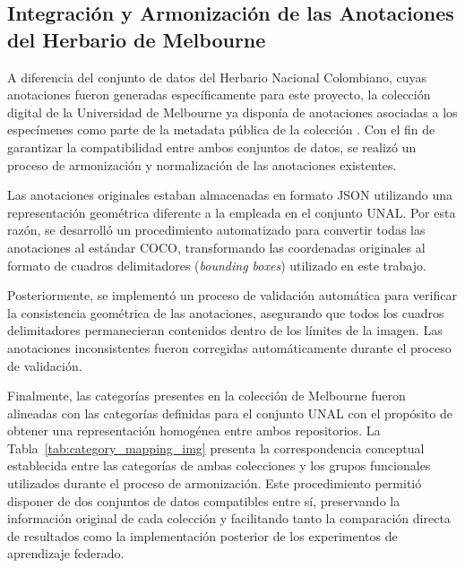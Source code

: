\subsection*{Integración y Armonización de las Anotaciones del Herbario de Melbourne}

A diferencia del conjunto de datos del Herbario Nacional Colombiano, cuyas anotaciones fueron generadas específicamente para este proyecto, la colección digital de la Universidad de Melbourne ya disponía de anotaciones asociadas a los especímenes como parte de la metadata pública de la colección \cite{SetMelu}. Con el fin de garantizar la compatibilidad entre ambos conjuntos de datos, se realizó un proceso de armonización y normalización de las anotaciones existentes.

Las anotaciones originales estaban almacenadas en formato JSON utilizando una representación geométrica diferente a la empleada en el conjunto UNAL. Por esta razón, se desarrolló un procedimiento automatizado para convertir todas las anotaciones al estándar COCO, transformando las coordenadas originales al formato de cuadros delimitadores (\textit{bounding boxes}) utilizado en este trabajo.

Posteriormente, se implementó un proceso de validación automática para verificar la consistencia geométrica de las anotaciones, asegurando que todos los cuadros delimitadores permanecieran contenidos dentro de los límites de la imagen. Las anotaciones inconsistentes fueron corregidas automáticamente durante el proceso de validación.

Finalmente, las categorías presentes en la colección de Melbourne fueron alineadas con las categorías definidas para el conjunto UNAL con el propósito de obtener una representación homogénea entre ambos repositorios. La Tabla~\ref{tab:category_mapping_img} presenta la correspondencia conceptual establecida entre las categorías de ambas colecciones y los grupos funcionales utilizados durante el proceso de armonización. Este procedimiento permitió disponer de dos conjuntos de datos compatibles entre sí, preservando la información original de cada colección y facilitando tanto la comparación directa de resultados como la implementación posterior de los experimentos de aprendizaje federado.



